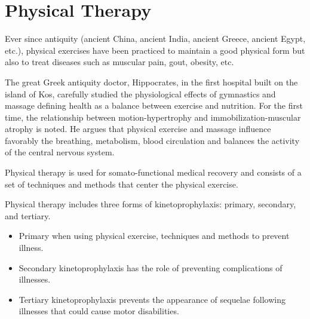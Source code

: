 \section{Physical Therapy}

Ever since antiquity (ancient China, ancient India, ancient Greece, ancient Egypt, etc.), 
physical exercises have been practiced to maintain a good physical
form but also to treat diseases such as muscular pain, gout, obesity, etc.


The great Greek antiquity doctor, Hippocrates, in the first hospital built on the island of Kos, 
carefully studied the physiological effects of gymnastics and massage defining health as a
 balance between exercise and nutrition. For the first time, the relationship between motion-hypertrophy and 
 immobilization-muscular atrophy is noted. He argues that physical exercise and massage influence favorably 
 the breathing, metabolism, blood circulation and balances the activity of the central nervous system. \cite{book.history.rehab.1991}


 Physical therapy is used for somato-functional medical recovery and 
 consists of a set of techniques and methods that center the physical exercise.

 Physical therapy includes three forms of kinetoprophylaxis: primary, secondary, and tertiary.

\begin{itemize}
  \item Primary when using physical exercise, techniques and methods to prevent illness.
  \item Secondary kinetoprophylaxis has the role of preventing complications of illnesses.
  \item Tertiary kinetoprophylaxis prevents the appearance of sequelae following illnesses that could cause motor disabilities.
\end{itemize}

